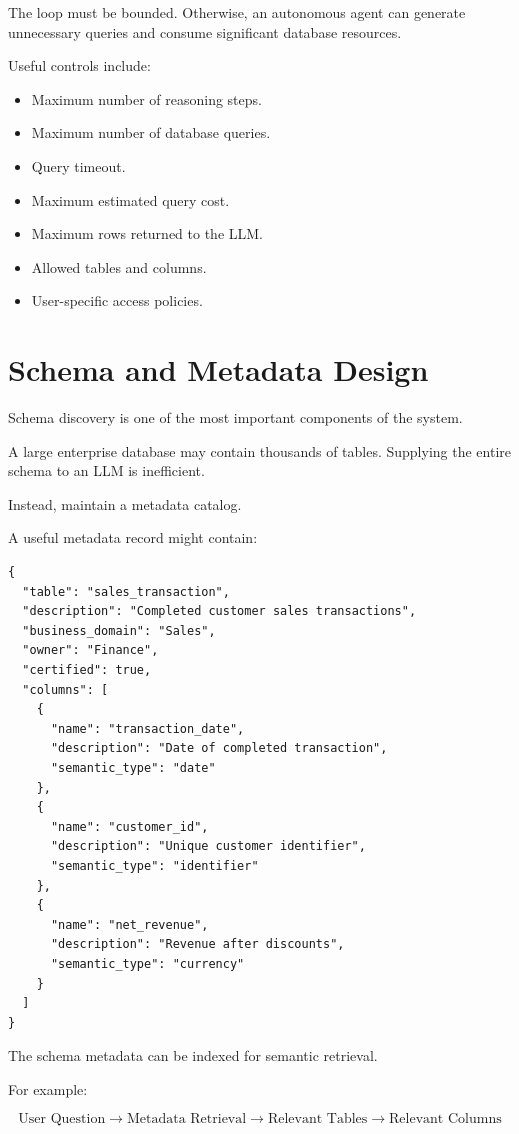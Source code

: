 \documentclass[11pt,a4paper]{article}
\begin{document}
The loop must be bounded. Otherwise, an autonomous agent can generate
unnecessary queries and consume significant database resources.

Useful controls include:

\begin{itemize}
    \item Maximum number of reasoning steps.
    \item Maximum number of database queries.
    \item Query timeout.
    \item Maximum estimated query cost.
    \item Maximum rows returned to the LLM.
    \item Allowed tables and columns.
    \item User-specific access policies.
\end{itemize}

\section{Schema and Metadata Design}

Schema discovery is one of the most important components of the system.

A large enterprise database may contain thousands of tables. Supplying the
entire schema to an LLM is inefficient.

Instead, maintain a metadata catalog.

A useful metadata record might contain:

\begin{lstlisting}
{
  "table": "sales_transaction",
  "description": "Completed customer sales transactions",
  "business_domain": "Sales",
  "owner": "Finance",
  "certified": true,
  "columns": [
    {
      "name": "transaction_date",
      "description": "Date of completed transaction",
      "semantic_type": "date"
    },
    {
      "name": "customer_id",
      "description": "Unique customer identifier",
      "semantic_type": "identifier"
    },
    {
      "name": "net_revenue",
      "description": "Revenue after discounts",
      "semantic_type": "currency"
    }
  ]
}
\end{lstlisting}

The schema metadata can be indexed for semantic retrieval.

For example:

\[
\text{User Question}
\rightarrow
\text{Metadata Retrieval}
\rightarrow
\text{Relevant Tables}
\rightarrow
\text{Relevant Columns}
\]
\end{document}

